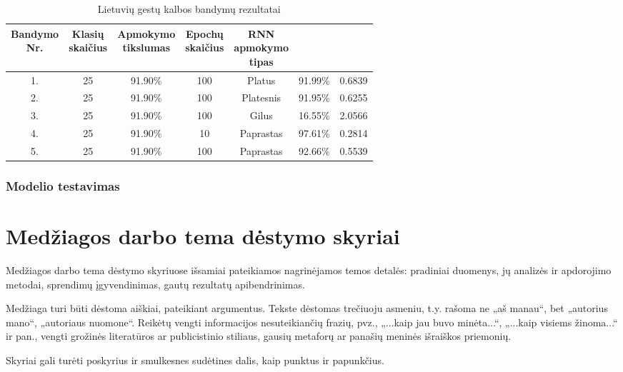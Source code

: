 \documentclass{VUMIFPSbakalaurinis}
\begin{document}
\begin{table}[H]\footnotesize
	\centering
	\caption{Lietuvių gestų kalbos bandymų rezultatai}
	{\begin{tabular}{| c | c | c | c | c | c | c |} \hline
		\thead{Bandymo\\Nr.} & \thead{Klasių\\skaičius} & \thead{Apmokymo\\tikslumas} & \thead{Epochų\\skaičius} & \thead{RNN\\apmokymo\\tipas} & \thead{Tikslumas} & \thead{Praradimas}  \\
		\hline
		1. & 25 & 91.90\% & 100 & Platus & 91.99\% & 0.6839 \\
		\hline
		2. & 25 & 91.90\% & 100 & Platesnis & 91.95\% & 0.6255 \\
		\hline
		3. & 25 & 91.90\% & 100 & Gilus & 16.55\% & 2.0566 \\
		\hline
		4. & 25 & 91.90\% & 10 & Paprastas & 97.61\% & 0.2814 \\
		\hline
		5. & 25 & 91.90\% & 100 & Paprastas & 92.66\% & 0.5539 \\
		\hline
	\end{tabular}}
	\label{tab:lgk-bandymai}
\end{table}

\subsubsection{Modelio testavimas}


\section{Medžiagos darbo tema dėstymo skyriai}
Medžiagos darbo tema dėstymo skyriuose išsamiai pateikiamos nagrinėjamos temos
detalės: pradiniai duomenys, jų analizės ir apdorojimo metodai, sprendimų
įgyvendinimas, gautų rezultatų apibendrinimas.

Medžiaga turi būti dėstoma aiškiai, pateikiant argumentus. Tekste dėstomas
trečiuoju asmeniu, t.y. rašoma ne „aš manau“, bet „autorius mano“, „autoriaus
nuomone“. Reikėtų vengti informacijos nesuteikiančių frazių, pvz., „...kaip jau
buvo minėta...“, „...kaip visiems žinoma...“ ir pan., vengti grožinės
literatūros ar publicistinio stiliaus, gausių metaforų ar panašių meninės
išraiškos priemonių.

Skyriai gali turėti poskyrius ir smulkesnes sudėtines dalis, kaip punktus ir
papunkčius.
\end{document}
